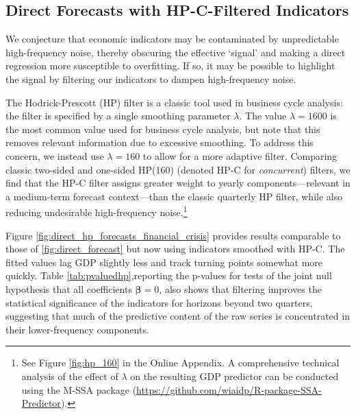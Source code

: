 \documentclass[11pt,a4paper]{article}
\begin{document}
\subsection{Direct Forecasts with HP-C-Filtered Indicators}\label{sec:hpdf}

We conjecture that economic indicators may be contaminated by unpredictable high-frequency noise, thereby obscuring the effective `signal' and making a direct regression more susceptible to overfitting. If so, it may be possible to highlight the signal by filtering our indicators to dampen high-frequency noise. 

The Hodrick-Prescott (HP) filter is a classic tool used in business cycle analysis: the filter is specified by a single smoothing parameter $\lambda$. The value $\lambda=1600$ is the most common value used for business cycle analysis, but \cite{Phillips_Jin_2021} note that this removes relevant information due to excessive smoothing. 
To address this concern, we instead use $\lambda = 160$ to allow for a more adaptive filter. Comparing classic two-sided and one-sided HP(160) (denoted HP-C for \textit{concurrent}) filters, we find that the HP-C filter assigns greater weight to yearly components---relevant in a medium-term forecast context---than the classic quarterly HP filter, while also reducing undesirable high-frequency noise.\footnote{See Figure \ref{fig:hp_160} in the Online Appendix. A comprehensive technical analysis of the effect of $\lambda$ on the resulting GDP predictor can be conducted using the M-SSA package (\url{https://github.com/wiaidp/R-package-SSA-Predictor}).}


Figure \ref{fig:direct_hp_forecasts_financial_crisis} provides results comparable to those of \ref{fig:direct_forecast} but now using indicators smoothed with HP-C. The fitted values lag GDP slightly less and track turning points somewhat more quickly. Table \ref{tab:pvaluedhp},reporting the p-values for tests of the joint null hypothesis that all coefficients ${\boldsymbol{\beta}} = 0$, also shows that filtering improves the statistical significance of the indicators for horizons beyond two quarters, suggesting that much of the predictive content of the raw series is concentrated in their lower-frequency components.
\end{document}
